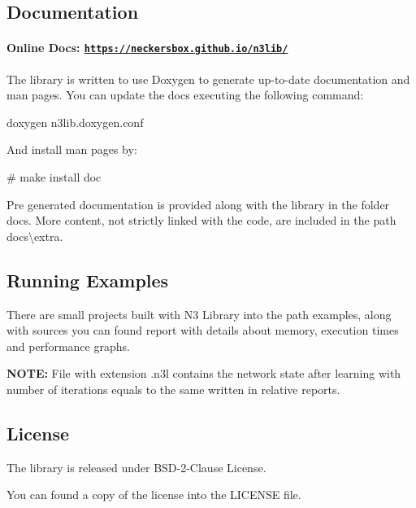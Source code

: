 \subsection*{Documentation}

\paragraph*{Online Docs\+: \href{https://neckersbox.github.io/n3lib/}{\tt https\+://neckersbox.\+github.\+io/n3lib/}}

The library is written to use Doxygen to generate up-\/to-\/date documentation and man pages. You can update the docs executing the following command\+:


\begin{DoxyCode}
doxygen n3lib.doxygen.conf
\end{DoxyCode}


And install man pages by\+:


\begin{DoxyCode}
# make install doc
\end{DoxyCode}


Pre generated documentation is provided along with the library in the folder {\ttfamily docs}. More content, not strictly linked with the code, are included in the path {\ttfamily docs\textbackslash{}extra}.

\subsection*{Running Examples}

There are small projects built with N3 Library into the path {\ttfamily examples}, along with sources you can found report with details about memory, execution times and performance graphs.

{\bfseries N\+O\+TE\+:} File with extension {\ttfamily .n3l} contains the network state after learning with number of iterations equals to the same written in relative reports.

\subsection*{License}

The library is released under B\+S\+D-\/2-\/\+Clause License.

You can found a copy of the license into the {\ttfamily L\+I\+C\+E\+N\+SE} file. 